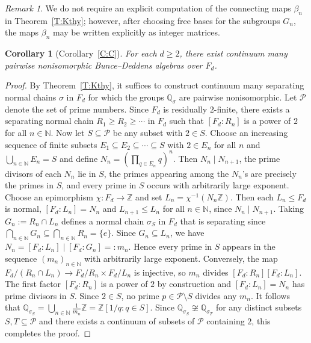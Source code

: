 \documentclass[11pt,a4,leqno]{amsart}
\newtheorem{cor}[thm]{Corollary}
\theoremstyle{definition}
\theoremstyle{remark}
\newtheorem{rem}[thm]{Remark}
\numberwithin{equation}{section}
\theoremstyle{plain}
\newcommand{\Nb}{\mathbb{N}}
\newcommand{\Zb}{\mathbb{Z}}
\newcommand{\Qb}{\mathbb{Q}}
\renewcommand{\P}{\mathcal{P}}
\begin{document}
\begin{rem}
    We do not require an explicit computation of the connecting maps $\beta_n$ in Theorem~\ref{T:Kthy}; however, after choosing free bases for the subgroups $G_n$, the maps $\beta_n$ may be written explicitly as integer matrices.  
\end{rem}

\begin{cor}[Corollary~\ref{C:C}]
    For each $d\ge 2$, there exist continuum many pairwise nonisomorphic Bunce--Deddens algebras over $F_d$.  
\end{cor}

\begin{proof}
    By Theorem~\ref{T:Kthy}, it suffices to construct continuum many separating normal chains $\sigma$ in $F_d$ for which the groups $\Qb_\sigma$ are pairwise nonisomorphic. Let $\P$ denote the set of prime numbers. Since $F_d$ is residually $2$-finite, there exists a separating normal chain $R_1\ge R_2\ge \cdots$ in $F_d$ such that $[F_d : R_n]$ is a power of $2$ for all $n\in \Nb$. Now let $S\subseteq \P$ be any subset with $2\in S$. Choose an increasing sequence of finite subsets $E_1\subseteq E_2 \subseteq \cdots \subseteq S$ with $2\in E_n$ for all $n$ and $\bigcup_{n\in\Nb} E_n = S$ and define $N_n = (\prod_{q\in E_n} q)^n$. Then $N_n \mid N_{n+1}$, the prime divisors of each $N_n$ lie in $S$, the primes appearing among the $N_n$'s are precisely the primes in $S$, and every prime in $S$ occurs with arbitrarily large exponent. Choose an epimorphism $\chi : F_d \to \Zb$ and set $L_n = \chi^{-1}(N_n\Zb)$. Then each $L_n\le F_d$ is normal, $[F_d : L_n] = N_n$ and $L_{n+1} \le L_n$ for all $n\in \Nb$, since $N_n\mid N_{n+1}$. Taking $G_n := R_n \cap L_n$ defines a normal chain $\sigma_S$ in $F_d$ that is separating since $\bigcap_{n\in \Nb} G_n \subseteq \bigcap_{n\in \Nb} R_n = \{e\}$. Since $G_n\subseteq L_n$, we have $N_n = [F_d : L_n] \mid [F_d : G_n] =: m_n$. Hence every prime in $S$ appears in the sequence $(m_n)_{n\in \Nb}$ with arbitrarily large exponent. Conversely, the map $F_d/(R_n\cap L_n) \to F_d/R_n \times F_d/L_n$ is injective, so $m_n$ divides $[F_d : R_n][F_d:L_n]$. The first factor $[F_d : R_n]$ is a power of $2$ by construction and $[F_d : L_n] = N_n$ has prime divisors in $S$. Since $2\in S$, no prime $p \in \P\setminus S$ divides any $m_n$. It follows that $\Qb_{\sigma_S} = \bigcup_{n\in \Nb} \frac{1}{m_n} \Zb = \Zb[1/q : q\in S]$. Since $\Qb_{\sigma_S} \not\cong \Qb_{\sigma_T}$ for any distinct subsets $S,T\subseteq \P$ and there exists a continuum of subsets of $\P$ containing $2$, this completes the proof. 
 \end{proof}
\end{document}
